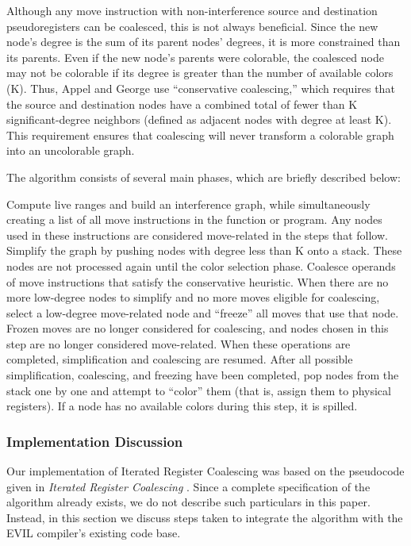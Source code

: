 \documentclass[12pt]{article}
\begin{document}
Although any move instruction with non-interference source and destination pseudoregisters can be coalesced, this is not always beneficial.
Since the new node's degree is the sum of its parent nodes' degrees, it is more constrained than its parents.
Even if the new node's parents were colorable, the coalesced node may not be colorable if its degree is greater than the number of available colors (K).
Thus, Appel and George use “conservative coalescing,” which requires that the source and destination nodes have a combined total of fewer than K significant-degree neighbors (defined as adjacent nodes with degree at least K).
This requirement ensures that coalescing will never transform a colorable graph into an uncolorable graph.

The algorithm consists of several main phases, which are briefly described below:

Compute live ranges and build an interference graph, while simultaneously creating a list of all move instructions in the function or program.
Any nodes used in these instructions are considered move-related in the steps that follow.
Simplify the graph by pushing nodes with degree less than K onto a stack.
These nodes are not processed again until the color selection phase.
Coalesce operands of move instructions that satisfy the conservative heuristic.
When there are no more low-degree nodes to simplify and no more moves eligible for coalescing, select a low-degree move-related node and “freeze” all moves that use that node.
Frozen moves are no longer considered for coalescing, and nodes chosen in this step are no longer considered move-related.
When these operations are completed, simplification and coalescing are resumed.
After all possible simplification, coalescing, and freezing have been completed, pop nodes from the stack one by one and attempt to “color” them (that is, assign them to physical registers).
If a node has no available colors during this step, it is spilled.

\subsubsection{Implementation Discussion}
Our implementation of Iterated Register Coalescing was based on the pseudocode given in \emph{Iterated Register Coalescing} \cite{iteratedRegisterCoalescing}.
Since a complete specification of the algorithm already exists, we do not describe such particulars in this paper.
Instead, in this section we discuss steps taken to integrate the algorithm with the EVIL compiler's existing code base.
\end{document}
